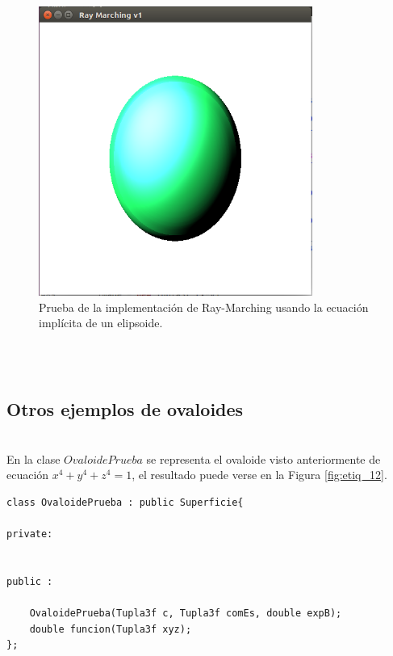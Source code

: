 \begin{figure}[h]
	\begin{center}
		\includegraphics[width=0.8\textwidth]{imagenes/Prueba2.png}
	\end{center}
	\caption{Prueba de la implementación de Ray-Marching usando la ecuación implícita de un elipsoide.}
	\label{fig:etiq_10}
\end{figure}
${ }$\\

${ }$\\
\subsection{Otros ejemplos de ovaloides}
${ }$\\

En la clase $OvaloidePrueba$ se representa el ovaloide visto anteriormente de ecuación $x^4 + y^4 + z^4 = 1$, el resultado puede verse en la Figura \ref{fig:etiq_12}.
${ }$\\

\begin{lstlisting}[style=Consola]
class OvaloidePrueba : public Superficie{

private:


public :

	OvaloidePrueba(Tupla3f c, Tupla3f comEs, double expB);
	double funcion(Tupla3f xyz);
};
\end{lstlisting}
${ }$\\

